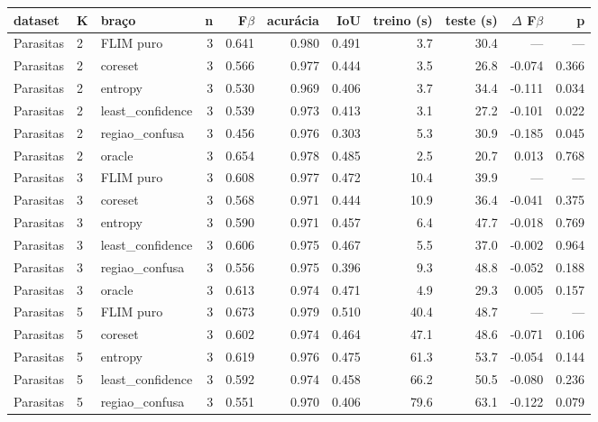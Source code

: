 \begin{tabular}{lllrrrrrrrr}
\hline
dataset & K & braço & n & F$\beta$ & acurácia & IoU & treino (s) & teste (s) & $\Delta$ F$\beta$ & p \\
\hline
Parasitas & 2 & FLIM puro & 3 & 0.641 & 0.980 & 0.491 & 3.7 & 30.4 & --- & --- \\
Parasitas & 2 & coreset & 3 & 0.566 & 0.977 & 0.444 & 3.5 & 26.8 & -0.074 & 0.366 \\
Parasitas & 2 & entropy & 3 & 0.530 & 0.969 & 0.406 & 3.7 & 34.4 & -0.111 & 0.034 \\
Parasitas & 2 & least\_confidence & 3 & 0.539 & 0.973 & 0.413 & 3.1 & 27.2 & -0.101 & 0.022 \\
Parasitas & 2 & regiao\_confusa & 3 & 0.456 & 0.976 & 0.303 & 5.3 & 30.9 & -0.185 & 0.045 \\
Parasitas & 2 & oracle & 3 & 0.654 & 0.978 & 0.485 & 2.5 & 20.7 & 0.013 & 0.768 \\
Parasitas & 3 & FLIM puro & 3 & 0.608 & 0.977 & 0.472 & 10.4 & 39.9 & --- & --- \\
Parasitas & 3 & coreset & 3 & 0.568 & 0.971 & 0.444 & 10.9 & 36.4 & -0.041 & 0.375 \\
Parasitas & 3 & entropy & 3 & 0.590 & 0.971 & 0.457 & 6.4 & 47.7 & -0.018 & 0.769 \\
Parasitas & 3 & least\_confidence & 3 & 0.606 & 0.975 & 0.467 & 5.5 & 37.0 & -0.002 & 0.964 \\
Parasitas & 3 & regiao\_confusa & 3 & 0.556 & 0.975 & 0.396 & 9.3 & 48.8 & -0.052 & 0.188 \\
Parasitas & 3 & oracle & 3 & 0.613 & 0.974 & 0.471 & 4.9 & 29.3 & 0.005 & 0.157 \\
Parasitas & 5 & FLIM puro & 3 & 0.673 & 0.979 & 0.510 & 40.4 & 48.7 & --- & --- \\
Parasitas & 5 & coreset & 3 & 0.602 & 0.974 & 0.464 & 47.1 & 48.6 & -0.071 & 0.106 \\
Parasitas & 5 & entropy & 3 & 0.619 & 0.976 & 0.475 & 61.3 & 53.7 & -0.054 & 0.144 \\
Parasitas & 5 & least\_confidence & 3 & 0.592 & 0.974 & 0.458 & 66.2 & 50.5 & -0.080 & 0.236 \\
Parasitas & 5 & regiao\_confusa & 3 & 0.551 & 0.970 & 0.406 & 79.6 & 63.1 & -0.122 & 0.079 \\

\end{tabular}
